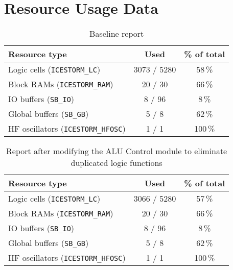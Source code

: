 \documentclass[a4paper,10pt]{article}
\begin{document}
\newpage
\appendix
\section{Resource Usage Data}

\begin{table}[H] 
    \centering
    \begin{tabularx}{0.6\textwidth}{X c c}
        \toprule
        Resource type & Used & \% of total \\ \midrule
        Logic cells (\texttt{ICESTORM\_LC}) & 3073 / 5280 & 58\,\% \\
        Block RAMs (\texttt{ICESTORM\_RAM}) & 20 / 30 & 66\,\% \\
        IO buffers (\texttt{SB\_IO}) & 8 / 96 & 8\,\% \\
        Global buffers (\texttt{SB\_GB}) & 5 / 8 & 62\,\% \\
        HF oscillators (\texttt{ICESTORM\_HFOSC}) & 1 / 1 & 100\,\% \\
        \bottomrule
    \end{tabularx}
    \caption{Baseline report}
    \label{tab:baseline}
\end{table}

\begin{table}[H] 
    \centering
    \begin{tabularx}{0.6\textwidth}{X c c}
        \toprule
        Resource type & Used & \% of total \\ \midrule
        Logic cells (\texttt{ICESTORM\_LC}) & 3066 / 5280 & 57\,\% \\
        Block RAMs (\texttt{ICESTORM\_RAM}) & 20 / 30 & 66\,\% \\
        IO buffers (\texttt{SB\_IO}) & 8 / 96 & 8\,\% \\
        Global buffers (\texttt{SB\_GB}) & 5 / 8 & 62\,\% \\
        HF oscillators (\texttt{ICESTORM\_HFOSC}) & 1 / 1 & 100\,\% \\
        \bottomrule
    \end{tabularx}
    \caption{Report after modifying the ALU Control module
    to eliminate duplicated logic functions}
    \label{tab:ALU_Control}
\end{table}
\end{document}
